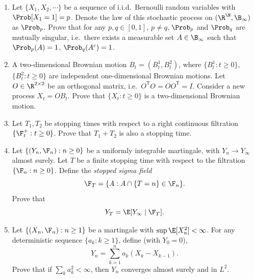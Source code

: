 
\begin{enumerate}
    \item Let $\{X_1, X_2, \cdots\}$ be a sequence of i.i.d.\ Bernoulli random variables with $\Prob[X_1 = 1] = p$. Denote the law of this stochastic process on $(\R^\N, \B_\infty)$ as $\Prob_p$. Prove that for any $p, q \in [0,1]$, $p \neq q$, $\Prob_p$ and $\Prob_q$ are mutually singular, i.e.\ there exists a measurable set $A \in \B_\infty$ such that $\Prob_p(A) = 1$, $\Prob_q(A^c) = 1$.

    \item A two-dimensional Brownian motion $B_t = (B_t^1, B_t^2)$, where $\{B_t^1 : t \geq 0\}$, $\{B_t^2 : t \geq 0\}$ are independent one-dimensional Brownian motions. Let $O \in \R^{2 \times 2}$ be an orthogonal matrix, i.e.\ $O^\mathsf{T} O = O O^\mathsf{T} = I$. Consider a new process $X_t = O B_t$. Prove that $\{X_t : t \geq 0\}$ is a two-dimensional Brownian motion.

    \item Let $T_1, T_2$ be stopping times with respect to a right continuous filtration $\{\F_t^+ : t \geq 0\}$. Prove that $T_1 + T_2$ is also a stopping time.

    \item Let $\{(Y_n, \F_n) : n \geq 0\}$ be a uniformly integrable martingale, with $Y_n \to Y_\infty$ almost surely. Let $T$ be a finite stopping time with respect to the filtration $\{\F_n : n \geq 0\}$. Define the \emph{stopped sigma field}
    \[
        \F_T = \{A : A \cap \{T = n\} \in \F_n\}.
    \]
    Prove that
    \[
        Y_T = \E[Y_\infty \mid \F_T].
    \]

    \item Let $\{(X_n, \F_n) : n \geq 1\}$ be a martingale with $\sup \E[X_n^2] < \infty$. For any deterministic sequence $\{a_k : k \geq 1\}$, define (with $Y_0 = 0$),
    \[
        Y_n = \sum_{k=1}^{n} a_k (X_k - X_{k-1}).
    \]
    Prove that if $\sum_k a_k^2 < \infty$, then $Y_n$ converges almost surely and in $L^2$.
\end{enumerate}
